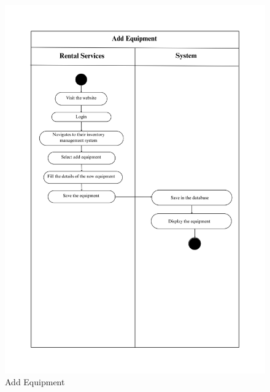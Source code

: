 \begin{figure}[h!]
    \centering
    \includegraphics[width=1\textwidth]{Images/Activity Diagrams/19 Add Equipment.png}
    \caption{ Add Equipment }
    \label{fig:activity-add-equ}
\end{figure}

